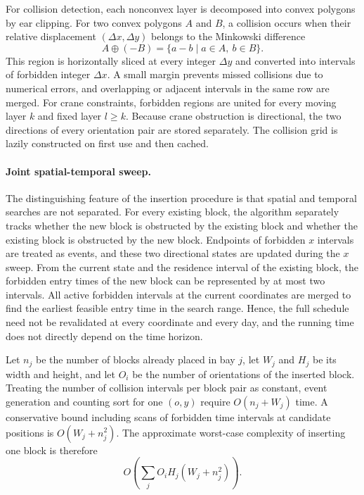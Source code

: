 \documentclass[runningheads]{llncs}
\begin{document}
For collision detection, each nonconvex layer is decomposed into convex polygons by ear clipping. For two convex polygons $A$ and $B$, a collision occurs when their relative displacement $(\Delta x,\Delta y)$ belongs to the Minkowski difference\cite{ghosh1993}
\begin{equation}
A\oplus(-B)=\{a-b\mid a\in A,\ b\in B\}.
\end{equation}
This region is horizontally sliced at every integer $\Delta y$ and converted into intervals of forbidden integer $\Delta x$. A small margin prevents missed collisions due to numerical errors, and overlapping or adjacent intervals in the same row are merged. For crane constraints, forbidden regions are united for every moving layer $k$ and fixed layer $l\ge k$. Because crane obstruction is directional, the two directions of every orientation pair are stored separately. The collision grid is lazily constructed on first use and then cached.

\paragraph{Joint spatial-temporal sweep.}
The distinguishing feature of the insertion procedure is that spatial and temporal searches are not separated. For every existing block, the algorithm separately tracks whether the new block is obstructed by the existing block and whether the existing block is obstructed by the new block. Endpoints of forbidden $x$ intervals are treated as events, and these two directional states are updated during the $x$ sweep. From the current state and the residence interval of the existing block, the forbidden entry times of the new block can be represented by at most two intervals. All active forbidden intervals at the current coordinates are merged to find the earliest feasible entry time in the search range. Hence, the full schedule need not be revalidated at every coordinate and every day, and the running time does not directly depend on the time horizon.

Let $n_j$ be the number of blocks already placed in bay $j$, let $W_j$ and $H_j$ be its width and height, and let $O_i$ be the number of orientations of the inserted block. Treating the number of collision intervals per block pair as constant, event generation and counting sort for one $(o,y)$ require $O(n_j+W_j)$ time. A conservative bound including scans of forbidden time intervals at candidate positions is $O(W_j+n_j^2)$. The approximate worst-case complexity of inserting one block is therefore
\begin{equation}
O\left(\sum_j O_iH_j(W_j+n_j^2)\right).
\end{equation}
\end{document}
